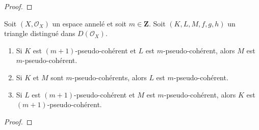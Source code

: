 {\begin{proof}
\end{proof}

\begin{lemma}

\label{lemma-cone-pseudo-coherent}

Soit $(X, \mathcal{O}_X)$ un espace annelé et soit $m \in \mathbf{Z}$. Soit $(K, L, M, f, g, h)$ un triangle distingué dans $D(\mathcal{O}_X)$.

\begin{enumerate}

\item Si $K$ est $(m + 1)$-pseudo-cohérent et $L$ est $m$-pseudo-cohérent, alors $M$ est $m$-pseudo-cohérent.
\item Si $K$ et $M$ sont $m$-pseudo-cohérents, alors $L$ est $m$-pseudo-cohérent.
\item Si $L$ est $(m + 1)$-pseudo-cohérent et $M$
est $m$-pseudo-cohérent, alors $K$ est $(m + 1)$-pseudo-cohérent.

\end{enumerate}

\end{lemma}

\begin{proof}


\end{proof}}
